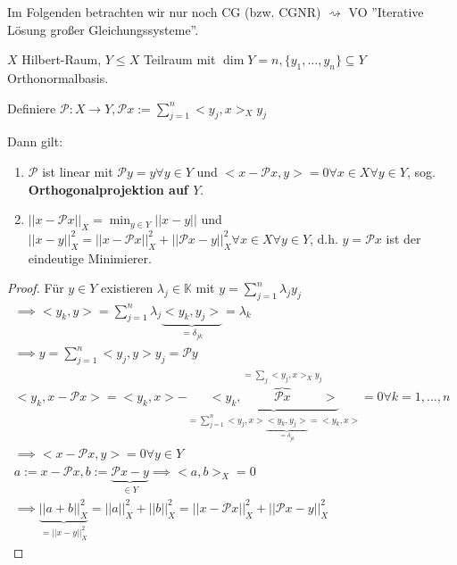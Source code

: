 Im Folgenden betrachten wir nur noch CG (bzw. CGNR) $\rightsquigarrow$ VO ''Iterative Lösung großer Gleichungssysteme''.

\begin{lemma}[Orthogonalprojektion]
	$X$ Hilbert-Raum, $Y \leq X$ Teilraum mit $\dim Y = n, \{y_1, ..., y_n\} \subseteq Y$ Orthonormalbasis.
	
	Definiere $\mathcal{P}: X \rightarrow Y, \mathcal{P}x := \sum_{j=1}^{n} <y_j, x>_X y_j$
	
	Dann gilt:
	\begin{enumerate}
		\item $\mathcal{P}$ ist linear mit $\mathcal{P}y = y \forall y \in Y$ und $<x-\mathcal{P}x, y> = 0 \forall x \in X \forall y \in Y$, sog. \textbf{Orthogonalprojektion auf $Y$}.
		
		\item $||x-\mathcal{P}x||_X = \min_{y \in Y} ||x-y||$ und $||x-y||_X^2 = ||x-\mathcal{P}x||_X^2 + ||\mathcal{P}x - y||_X^2 \forall x \in X \forall y \in Y$, d.h. $y = \mathcal{P}x$ ist der eindeutige Minimierer.
	\end{enumerate}
\end{lemma}

\begin{proof}
	Für $y \in Y$ existieren $\lambda_j \in \mathbb{K}$ mit $y = \sum_{j=1}^{n} \lambda_j y_j$
	\begin{align*}
		\implies <y_k, y> = \sum_{j=1}^{n} \lambda_j \underbrace{<y_k, y_j>}_{=\delta_{jk}} = \lambda_k\\
		\implies y = \sum_{j=1}^{n} <y_j, y> y_j = \mathcal{P}y\\
		<y_k, x-\mathcal{P}x> = <y_k, x> - \underbrace{<y_k, \overbrace{\mathcal{P}x}^{= \sum_j <y_j, x>_X y_j}>}_{= \sum_{j=1}^{n} <y_j, x>\underbrace{<y_k, y_j>}_{=\delta_{jk}} = <y_k, x>} = 0 \forall k=1, ..., n\\
		\implies <x-\mathcal{P}x, y> = 0 \forall y \in Y\\
		a := x - \mathcal{P}x, b := \underbrace{\mathcal{P}x - y}_{\in Y} \implies <a, b>_X = 0\\
		\implies \underbrace{||a+b||_X^2}_{=||x-y||_X^2} = ||a||_X^2 + ||b||_X^2 = ||x-\mathcal{P}x||_X^2 + ||\mathcal{P}x - y||_X^2
	\end{align*}
\end{proof}

